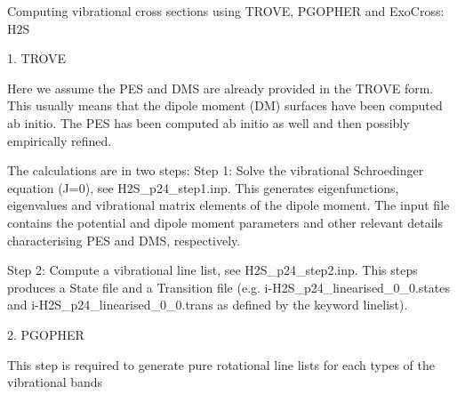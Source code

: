 Computing vibrational cross sections using TROVE, PGOPHER and ExoCross: H2S 

1. TROVE 

Here we assume the PES and DMS are already provided in the TROVE form. This usually means that the dipole moment (DM) surfaces have been computed ab initio. The PES has been computed ab initio as well and then possibly empirically refined. 

The calculations are in two steps:
Step 1: Solve the vibrational Schroedinger equation (J=0), see H2S_p24_step1.inp. This generates eigenfunctions, eigenvalues and vibrational matrix elements of the dipole moment. The input file contains the potential and dipole moment parameters and other relevant details characterising PES and DMS, respectively. 

Step 2: Compute a vibrational line list, see H2S_p24_step2.inp. This steps produces a State file and a Transition file (e.g. i-H2S_p24_linearised_0_0.states and i-H2S_p24_linearised_0_0.trans as defined by the keyword linelist).

2. PGOPHER

This step is required to generate pure rotational line lists for each types of the vibrational bands 


